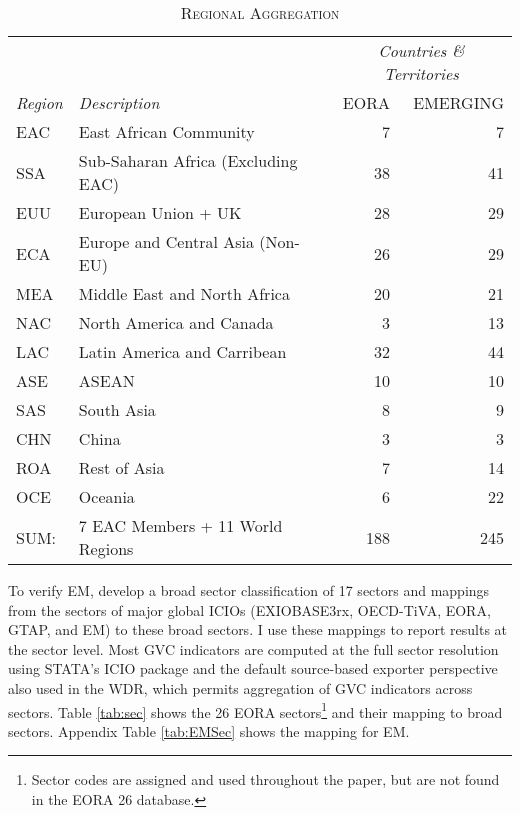 \documentclass[a4paper]{article}
\begin{document}
\begin{table}[h!]
\centering
\caption{\textsc{Regional Aggregation}}

\label{tab:ctry}
\vspace{2mm}
\begin{tabular}{llrr} \toprule
& & \multicolumn{2}{c}{\textit{Countries \& Territories}} \\
\textit{Region} & \textit{Description} & EORA & EMERGING \\ \midrule
EAC & East African Community & 7 & 7 \\
SSA & Sub-Saharan Africa (Excluding EAC) & 38 & 41 \\
EUU & European Union + UK & 28 & 29 \\
ECA & Europe and Central Asia (Non-EU) & 26 & 29 \\
MEA & Middle East and North Africa & 20 & 21\\
NAC & North America and Canada & 3 & 13 \\
LAC & Latin America and Carribean & 32 & 44 \\
ASE & ASEAN & 10 & 10 \\
SAS & South Asia & 8 & 9 \\
CHN & China & 3 & 3 \\
ROA & Rest of Asia & 7 & 14 \\
OCE & Oceania & 6 & 22 \\ \midrule
SUM: & 7 EAC Members + 11 World Regions & 188 & 245
 \\ \bottomrule
\end{tabular}
\end{table}
\FloatBarrier


To verify EM, \citep{huo2022full} develop a broad sector classification of 17 sectors and mappings from the sectors of major global ICIOs (EXIOBASE3rx, OECD-TiVA, EORA, GTAP, and EM) to these broad sectors. I use these mappings to report results at the sector level. Most GVC indicators are computed at the full sector resolution using STATA's ICIO package \citep{belotti2020icio} and the default source-based exporter perspective \citep{borin2019measuring} also used in the WDR, which permits aggregation of GVC indicators across sectors. Table \ref{tab:sec} shows the 26 EORA sectors\footnote{Sector codes are assigned and used throughout the paper, but are not found in the EORA 26 database.} and their mapping to broad sectors. Appendix Table \ref{tab:EMSec} shows the mapping for EM. 
 
\end{document}
